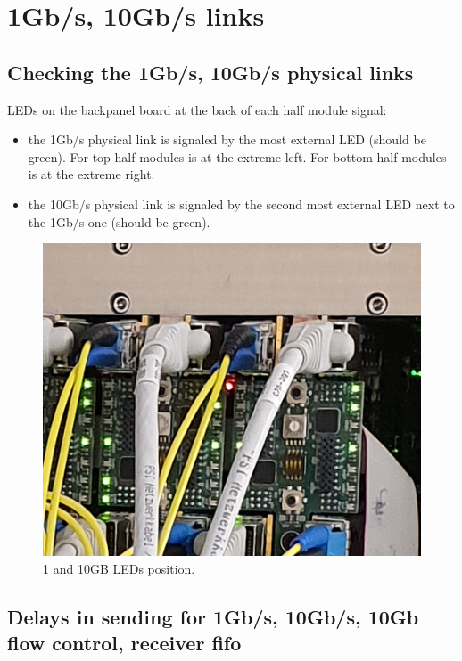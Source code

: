 \documentclass{article}
\begin{document}
\section{1Gb/s, 10Gb/s links}
\subsection{Checking the 1Gb/s, 10Gb/s physical links}\label{led}
LEDs on the backpanel board at the back of each half module signal:
\begin{itemize}
\item  the 1Gb/s physical link is signaled by the most external LED (should be green). For top half modules is at the extreme left. For bottom half modules is at the extreme right.  
\item the 10Gb/s physical link is signaled by the second most external LED next to the 1Gb/s one (should be green). 
\end{itemize}

\begin{figure}[t]
\begin{center}
\includegraphics[width=.7\textwidth]{LEDSim}
\end{center}
\caption{1 and 10GB LEDs position.}
\label{fLEDs}
\end{figure}




\subsection{Delays in sending for 1Gb/s, 10Gb/s, 10Gb flow control, receiver fifo}
\end{document}
